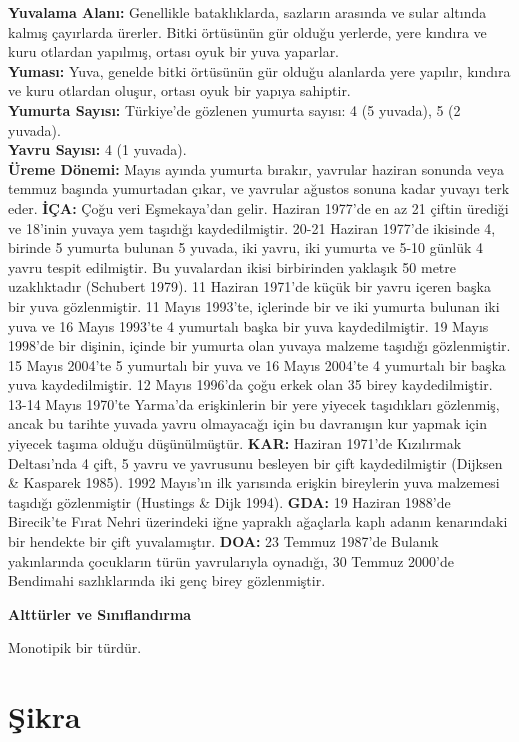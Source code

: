 \documentclass[
  letterpaper,
  DIV=11,
  numbers=noendperiod]{scrreprt}
\begin{document}
\textbf{Yuvalama Alanı:} Genellikle bataklıklarda, sazların arasında ve
sular altında kalmış çayırlarda ürerler. Bitki örtüsünün gür olduğu
yerlerde, yere kındıra ve kuru otlardan yapılmış, ortası oyuk bir yuva
yaparlar.\\
\textbf{Yuması:} Yuva, genelde bitki örtüsünün gür olduğu alanlarda yere
yapılır, kındıra ve kuru otlardan oluşur, ortası oyuk bir yapıya
sahiptir.\\
\textbf{Yumurta Sayısı:} Türkiye'de gözlenen yumurta sayısı: 4 (5
yuvada), 5 (2 yuvada).\\
\textbf{Yavru Sayısı:} 4 (1 yuvada).\\
\textbf{Üreme Dönemi:} Mayıs ayında yumurta bırakır, yavrular haziran
sonunda veya temmuz başında yumurtadan çıkar, ve yavrular ağustos sonuna
kadar yuvayı terk eder. \textbf{İÇA:} Çoğu veri Eşmekaya'dan gelir.
Haziran 1977'de en az 21 çiftin ürediği ve 18'inin yuvaya yem taşıdığı
kaydedilmiştir. 20-21 Haziran 1977'de ikisinde 4, birinde 5 yumurta
bulunan 5 yuvada, iki yavru, iki yumurta ve 5-10 günlük 4 yavru tespit
edilmiştir. Bu yuvalardan ikisi birbirinden yaklaşık 50 metre
uzaklıktadır (Schubert 1979). 11 Haziran 1971'de küçük bir yavru içeren
başka bir yuva gözlenmiştir. 11 Mayıs 1993'te, içlerinde bir ve iki
yumurta bulunan iki yuva ve 16 Mayıs 1993'te 4 yumurtalı başka bir yuva
kaydedilmiştir. 19 Mayıs 1998'de bir dişinin, içinde bir yumurta olan
yuvaya malzeme taşıdığı gözlenmiştir. 15 Mayıs 2004'te 5 yumurtalı bir
yuva ve 16 Mayıs 2004'te 4 yumurtalı bir başka yuva kaydedilmiştir. 12
Mayıs 1996'da çoğu erkek olan 35 birey kaydedilmiştir. 13-14 Mayıs
1970'te Yarma'da erişkinlerin bir yere yiyecek taşıdıkları gözlenmiş,
ancak bu tarihte yuvada yavru olmayacağı için bu davranışın kur yapmak
için yiyecek taşıma olduğu düşünülmüştür. \textbf{KAR:} Haziran 1971'de
Kızılırmak Deltası'nda 4 çift, 5 yavru ve yavrusunu besleyen bir çift
kaydedilmiştir (Dijksen \& Kasparek 1985). 1992 Mayıs'ın ilk yarısında
erişkin bireylerin yuva malzemesi taşıdığı gözlenmiştir (Hustings \&
Dijk 1994). \textbf{GDA:} 19 Haziran 1988'de Birecik'te Fırat Nehri
üzerindeki iğne yapraklı ağaçlarla kaplı adanın kenarındaki bir hendekte
bir çift yuvalamıştır. \textbf{DOA:} 23 Temmuz 1987'de Bulanık
yakınlarında çocukların türün yavrularıyla oynadığı, 30 Temmuz 2000'de
Bendimahi sazlıklarında iki genç birey gözlenmiştir.

\textbf{Alttürler ve Sınıflandırma}

Monotipik bir türdür.

\section{Şikra}\label{ux15fikra}
\end{document}
